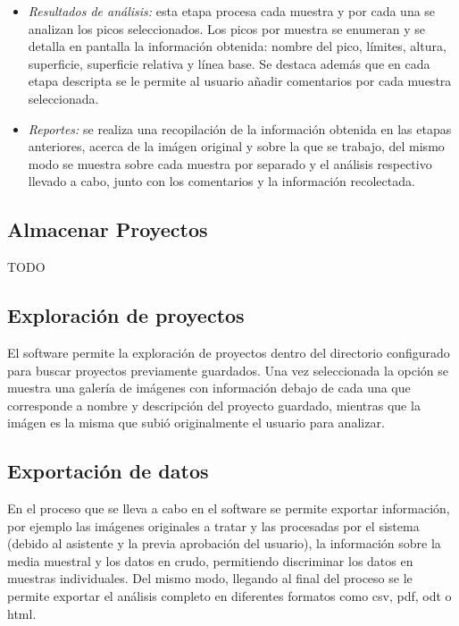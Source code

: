 \begin{itemize}
	\item \textit{Resultados de an\'alisis:} esta etapa procesa cada muestra y por cada una se analizan los picos seleccionados. Los picos por muestra se enumeran y se detalla en pantalla la informaci\'on obtenida: nombre del pico, l\'imites, altura, superficie, superficie relativa y l\'inea base. Se destaca adem\'as que en cada etapa descripta se le permite al usuario a\~nadir comentarios por cada muestra seleccionada.
	\item \textit{Reportes:} se realiza una recopilaci\'on de la informaci\'on obtenida en las etapas anteriores, acerca de la im\'agen original y sobre la que se trabajo, del mismo modo se muestra sobre cada muestra por separado y el an\'alisis respectivo llevado a cabo, junto con los comentarios y la informaci\'on recolectada.
\end{itemize}

\subsection{Almacenar Proyectos}
TODO

\subsection{Exploraci\'on de proyectos}
El software permite la exploraci\'on de proyectos dentro del directorio configurado para buscar proyectos previamente guardados. Una vez seleccionada la opci\'on se muestra una galer\'ia de im\'agenes con informaci\'on debajo de cada una que corresponde a nombre y descripci\'on del proyecto guardado, mientras que la im\'agen es la misma que subi\'o originalmente el usuario para analizar.

\subsection{Exportaci\'on de datos}
En el proceso que se lleva a cabo en el software se permite exportar informaci\'on, por ejemplo las im\'agenes originales a tratar y las procesadas por el sistema (debido al asistente y la previa aprobaci\'on del usuario), la informaci\'on sobre la media muestral y los datos en crudo, permitiendo discriminar los datos en muestras individuales. Del mismo modo, llegando al final del proceso se le permite exportar el an\'alisis completo en diferentes formatos como csv, pdf, odt o html.

